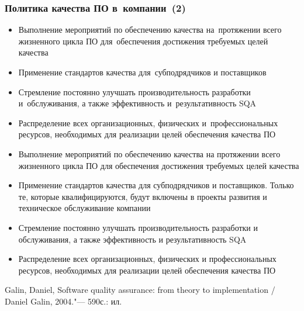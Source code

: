 \documentclass{../industrial-development}
\begin{document}
\begin{frame} \frametitle{Политика качества ПО в~компании~(2)}
	\begin{itemize}
\item Выполнение мероприятий по обеспечению качества на~протяжении всего жизненного цикла ПО для~обеспечения достижения требуемых целей качества
\item Применение стандартов качества для~субподрядчиков и поставщиков
\item Стремление постоянно улучшать производительность разработки и~обслуживания, а также эффективность и~результативность SQA
\item  Распределение всех организационных, физических и~профессиональных ресурсов, необходимых для реализации целей обеспечения качества ПО
  	\end{itemize}
\end{frame}

\lecturenotes

	\begin{itemize}
\item Выполнение мероприятий по обеспечению качества на протяжении всего жизненного цикла ПО для обеспечения достижения требуемых целей качества
\item Применение стандартов качества для субподрядчиков и поставщиков. Только те, которые квалифицируются, будут включены в проекты развития и техническое обслуживание компании
\item Стремление постоянно улучшать производительность разработки и обслуживания, а также эффективность и результативность SQA
\item  Распределение всех организационных, физических и профессиональных ресурсов, необходимых для реализации целей обеспечения качества ПО~\cite[с.~545--546]{SQA-Galin}
  	\end{itemize}









\begin{thebibliography}{99}
 Galin, Daniel, Software quality assurance: from theory to implementation / Daniel Galin, 2004."--- 590с.: ил.
\end{thebibliography}
\end{document}
